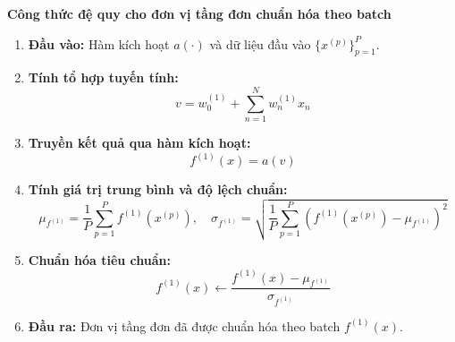 \documentclass{book}
\begin{document}
    \textbf{Công thức đệ quy cho đơn vị tầng đơn chuẩn hóa theo batch}
    \begin{enumerate}
        \item \textbf{Đầu vào:} Hàm kích hoạt $a(\cdot)$ và dữ liệu đầu vào $\{x^{(p)}\}_{p=1}^{P}$.
        
        \item \textbf{Tính tổ hợp tuyến tính:} 
        \[
        v = w^{(1)}_0 + \sum_{n=1}^{N} w^{(1)}_n x_n
        \]
        
        \item \textbf{Truyền kết quả qua hàm kích hoạt:} 
        \[
        f^{(1)}(x) = a(v)
        \]
        
        \item \textbf{Tính giá trị trung bình và độ lệch chuẩn:}
        \[
        \mu_{f^{(1)}} = \frac{1}{P} \sum_{p=1}^{P} f^{(1)}(x^{(p)}), \quad 
        \sigma_{f^{(1)}} = \sqrt{ \frac{1}{P} \sum_{p=1}^{P} \left( f^{(1)}(x^{(p)}) - \mu_{f^{(1)}} \right)^2 }
        \]
        
        \item \textbf{Chuẩn hóa tiêu chuẩn:} 
        \[
        f^{(1)}(x) \leftarrow \frac{f^{(1)}(x) - \mu_{f^{(1)}}}{\sigma_{f^{(1)}}}
        \]
        
        \item \textbf{Đầu ra:} Đơn vị tầng đơn đã được chuẩn hóa theo batch $f^{(1)}(x)$.
    \end{enumerate}
\end{document}
